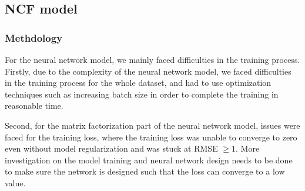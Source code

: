 \documentclass[final]{cvpr}
\begin{document}
\subsection{\ac{NCF} model}
\subsubsection{Methdology}
For the neural network model, we mainly faced difficulties in the training process.
Firstly, due to the complexity of the neural network model,
we faced difficulties in the training process for the whole dataset,
and had to use optimization techniques such as increasing batch size in order to complete the training in reasonable time.

Second, for the matrix factorization part of the neural network model,
issues were faced for the training loss,
where the training loss was unable to converge to zero even without model regularization and was stuck at RMSE $\ge 1$.
More investigation on the model training and neural network design needs to be done
to make sure the network is designed such that the loss can converge to a low value.

{\small
	
	
}
\end{document}

